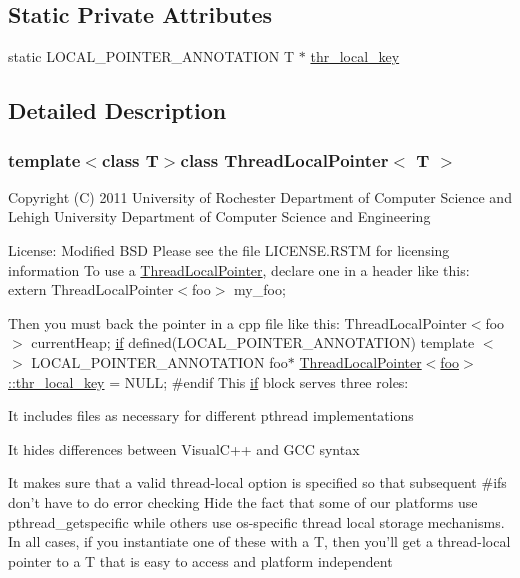 \subsection*{Static Private Attributes}
\begin{DoxyCompactItemize}
\item 
static L\-O\-C\-A\-L\-\_\-\-P\-O\-I\-N\-T\-E\-R\-\_\-\-A\-N\-N\-O\-T\-A\-T\-I\-O\-N T $\ast$ \hyperlink{classThreadLocalPointer_a51e14971b3275a17be597258a5010988}{thr\-\_\-local\-\_\-key}
\end{DoxyCompactItemize}


\subsection{Detailed Description}
\subsubsection*{template$<$class T$>$class Thread\-Local\-Pointer$<$ T $>$}

Copyright (C) 2011 University of Rochester Department of Computer Science and Lehigh University Department of Computer Science and Engineering

License\-: Modified B\-S\-D Please see the file L\-I\-C\-E\-N\-S\-E.\-R\-S\-T\-M for licensing information To use a \hyperlink{classThreadLocalPointer}{Thread\-Local\-Pointer}, declare one in a header like this\-: extern Thread\-Local\-Pointer$<$foo$>$ my\-\_\-foo;

Then you must back the pointer in a cpp file like this\-: Thread\-Local\-Pointer$<$foo$>$ current\-Heap; \hyperlink{stmskip_8cc_a6691aa84f1bbf53bde80356be0be52f9}{if} defined(\-L\-O\-C\-A\-L\-\_\-\-P\-O\-I\-N\-T\-E\-R\-\_\-\-A\-N\-N\-O\-T\-A\-T\-I\-O\-N) template $<$$>$ L\-O\-C\-A\-L\-\_\-\-P\-O\-I\-N\-T\-E\-R\-\_\-\-A\-N\-N\-O\-T\-A\-T\-I\-O\-N foo$\ast$ \hyperlink{classThreadLocalPointer_a51e14971b3275a17be597258a5010988}{Thread\-Local\-Pointer$<$foo$>$\-::thr\-\_\-local\-\_\-key} = N\-U\-L\-L; \#endif This \hyperlink{stmskip_8cc_a6691aa84f1bbf53bde80356be0be52f9}{if} block serves three roles\-:
\begin{DoxyItemize}
\item It includes files as necessary for different pthread implementations
\item It hides differences between Visual\-C++ and G\-C\-C syntax
\item It makes sure that a valid thread-\/local option is specified so that subsequent \#ifs don't have to do error checking Hide the fact that some of our platforms use pthread\-\_\-getspecific while others use os-\/specific thread local storage mechanisms. In all cases, if you instantiate one of these with a T, then you'll get a thread-\/local pointer to a T that is easy to access and platform independent 
\end{DoxyItemize}

